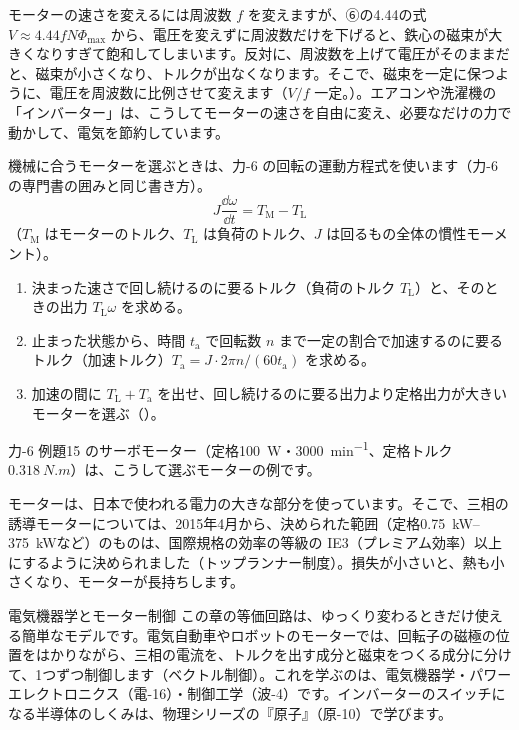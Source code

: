 モーターの速さを変えるには周波数 $f$ を変えますが、⑥の4.44の式 $V\approx4.44fN\Phi_{\max}$ から、電圧を変えずに周波数だけを下げると、鉄心の磁束が大きくなりすぎて飽和してしまいます。反対に、周波数を上げて電圧がそのままだと、磁束が小さくなり、トルクが出なくなります。そこで、磁束を一定に保つように、電圧を周波数に比例させて変えます（$V/f$ 一定。）。エアコンや洗濯機の「インバーター」は、こうしてモーターの速さを自由に変え、必要なだけの力で動かして、電気を節約しています。

\label{ph:電-12:sec10}
機械に合うモーターを選ぶときは、力-6 の回転の運動方程式を使います（力-6 の専門書の囲みと同じ書き方）。
\[J\frac{\dd\omega}{\dd t}=T_{\mathrm M}-T_{\mathrm L}\]
（$T_{\mathrm M}$ はモーターのトルク、$T_{\mathrm L}$ は負荷のトルク、$J$ は回るもの全体の慣性モーメント）。
\begin{enumerate}[label={\bkcircled{\arabic*}}, leftmargin=2.4\zw, itemsep=2pt, topsep=2pt]
\item 決まった速さで回し続けるのに要るトルク（負荷のトルク $T_{\mathrm L}$）と、そのときの出力 $T_{\mathrm L}\omega$ を求める。
\item 止まった状態から、時間 $t_{\mathrm a}$ で回転数 $n$ まで一定の割合で加速するのに要るトルク（加速トルク）$T_{\mathrm a}=J\cdot2\pi n/(60t_{\mathrm a})$ を求める。
\item 加速の間に $T_{\mathrm L}+T_{\mathrm a}$ を出せ、回し続けるのに要る出力より定格出力が大きいモーターを選ぶ（）。
\end{enumerate}
力-6 例題15 のサーボモーター（定格\qty{100}{W}・\qty{3000}{min^{-1}}、定格トルク$\qty{0.318}{N.m}$）は、こうして選ぶモーターの例です。

モーターは、日本で使われる電力の大きな部分を使っています。そこで、三相の誘導モーターについては、2015年4月から、決められた範囲（定格\qtyrange{0.75}{375}{kW}など）のものは、国際規格の効率の等級の IE3（プレミアム効率）以上にするように決められました（トップランナー制度）。損失が小さいと、熱も小さくなり、モーターが長持ちします。

\begin{phsaki}{電気機器学とモーター制御}
この章の等価回路は、ゆっくり変わるときだけ使える簡単なモデルです。電気自動車やロボットのモーターでは、回転子の磁極の位置をはかりながら、三相の電流を、トルクを出す成分と磁束をつくる成分に分けて、1つずつ制御します（ベクトル制御）。これを学ぶのは、電気機器学・パワーエレクトロニクス（電-16）・制御工学（波-4）です。インバーターのスイッチになる半導体のしくみは、物理シリーズの『原子』（原-10）で学びます。
\end{phsaki}

